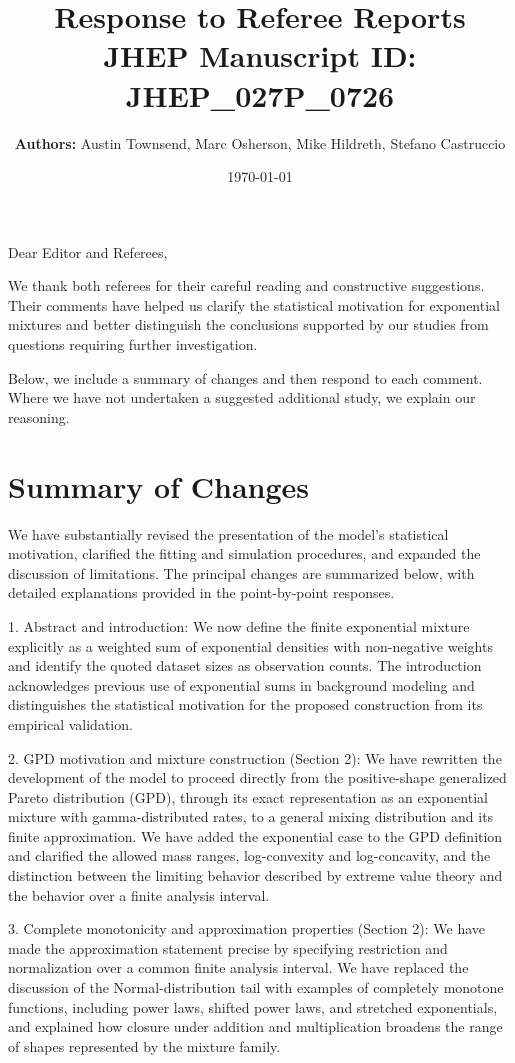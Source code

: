 \documentclass[11pt,a4paper]{article}
\title{\textbf{Response to Referee Reports}\\
\large JHEP Manuscript ID: JHEP\_027P\_0726}
\author{\textbf{Authors:} Austin Townsend, Marc Osherson, Mike Hildreth, Stefano Castruccio}
\date{\today}
\begin{document}
\maketitle

\noindent Dear Editor and Referees,

\medskip
We thank both referees for their careful reading and constructive suggestions. Their comments have helped us clarify the statistical motivation for exponential mixtures and better distinguish the conclusions supported by our studies from questions requiring further investigation.

Below, we include a summary of changes and then respond to each comment. Where we have not undertaken a suggested additional study, we explain our reasoning.

\section*{Summary of Changes}

We have substantially revised the presentation of the model’s statistical motivation, clarified the fitting and simulation procedures, and expanded the discussion of limitations. The principal changes are summarized below, with detailed explanations provided in the point-by-point responses.

1. Abstract and introduction: We now define the finite exponential mixture explicitly as a weighted sum of exponential densities with non-negative weights and identify the quoted dataset sizes as observation counts. The introduction acknowledges previous use of exponential sums in background modeling and distinguishes the statistical motivation for the proposed construction from its empirical validation.

2. GPD motivation and mixture construction (Section 2): We have rewritten the development of the model to proceed directly from the positive-shape generalized Pareto distribution (GPD), through its exact representation as an exponential mixture with gamma-distributed rates, to a general mixing distribution and its finite approximation. We have added the exponential case to the GPD definition and clarified the allowed mass ranges, log-convexity and log-concavity, and the distinction between the limiting behavior described by extreme value theory and the behavior over a finite analysis interval.

3. Complete monotonicity and approximation properties (Section 2): We have made the approximation statement precise by specifying restriction and normalization over a common finite analysis interval. We have replaced the discussion of the Normal-distribution tail with examples of completely monotone functions, including power laws, shifted power laws, and stretched exponentials, and explained how closure under addition and multiplication broadens the range of shapes represented by the mixture family.
\end{document}
